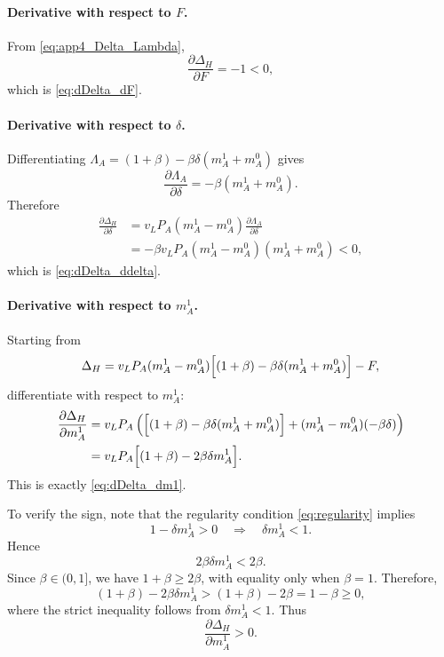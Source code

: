 \paragraph{Derivative with respect to $F$.}
From \eqref{eq:app4_Delta_Lambda},
\begin{equation}
\frac{\partial \Delta_H}{\partial F}=-1<0,
\label{eq:app4_dDelta_dF}
\end{equation}
which is \eqref{eq:dDelta_dF}.

\paragraph{Derivative with respect to $\delta$.}
Differentiating $\Lambda_A=(1+\beta)-\beta\delta(m_A^1+m_A^0)$ gives
\[
\frac{\partial \Lambda_A}{\partial \delta}=-\beta(m_A^1+m_A^0).
\]
Therefore
\begin{align}
\frac{\partial \Delta_H}{\partial \delta}
&=
v_L P_A(m_A^1-m_A^0)\frac{\partial \Lambda_A}{\partial \delta}
\nonumber\\
&=
-\beta v_L P_A(m_A^1-m_A^0)(m_A^1+m_A^0)
<0,
\label{eq:app4_dDelta_ddelta}
\end{align}
which is \eqref{eq:dDelta_ddelta}.

\paragraph{Derivative with respect to $m_A^1$.}
Starting from
\[
\Delta_H=v_L P_A(m_A^1-m_A^0)\Bigl[(1+\beta)-\beta\delta(m_A^1+m_A^0)\Bigr]-F,
\]
differentiate with respect to $m_A^1$:
\begin{align}
\frac{\partial \Delta_H}{\partial m_A^1}
&=
v_L P_A
\left(
\Bigl[(1+\beta)-\beta\delta(m_A^1+m_A^0)\Bigr]
+
(m_A^1-m_A^0)(-\beta\delta)
\right)
\nonumber\\
&=
v_L P_A\Bigl[(1+\beta)-2\beta\delta m_A^1\Bigr].
\label{eq:app4_dDelta_dm1_raw}
\end{align}
This is exactly \eqref{eq:dDelta_dm1}.

To verify the sign, note that the regularity condition \eqref{eq:regularity} implies
\[
1-\delta m_A^1>0
\quad\Longrightarrow\quad
\delta m_A^1<1.
\]
Hence
\[
2\beta\delta m_A^1<2\beta.
\]
Since $\beta\in(0,1]$, we have $1+\beta\ge 2\beta$, with equality only when $\beta=1$. Therefore,
\[
(1+\beta)-2\beta\delta m_A^1>(1+\beta)-2\beta=1-\beta\ge 0,
\]
where the strict inequality follows from $\delta m_A^1<1$. Thus
\begin{equation}
\frac{\partial \Delta_H}{\partial m_A^1}>0.
\label{eq:app4_dDelta_dm1_sign}
\end{equation}

